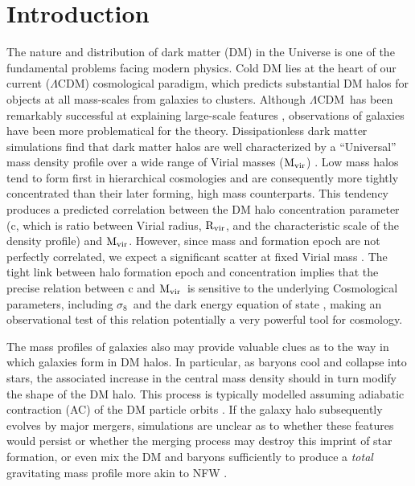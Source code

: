 \documentclass{emulateapj}
\def \eg {e.g.}
\newcommand{\mvir}{${\rm M_{vir}}$}
\newcommand{\sigmaeight}{$\sigma_8$}
\newcommand{\lcdm}{$\Lambda$CDM}
\newcommand{\rvir }{${\rm R_{vir}}$}
\begin{document}

\section{Introduction}
The nature and distribution of dark matter (DM) in the Universe is one
of the fundamental problems facing modern physics. Cold DM lies at the
heart of  our  current (\lcdm) cosmological   paradigm, which predicts
substantial  DM halos for objects  at all mass-scales from galaxies to
clusters.   Although  \lcdm\  has  been    remarkably  successful   at
explaining large-scale features
\citep[\eg][]{spergel03a,perlmutter99a}, 
observations of galaxies have been more problematical for the theory.
Dissipationless dark matter simulations find that dark matter
halos are well characterized by a
``Universal'' mass density profile \citep[][hereafter NFW]{navarro97}
over a wide range of Virial masses (\mvir) \citep[e.g.][]{bullock01a}.
Low mass halos tend to form first in hierarchical cosmologies
and are consequently more tightly concentrated than their
later forming,  high mass counterparts.
This tendency  produces a predicted correlation
between the DM halo concentration parameter (c, which is ratio between 
Virial radius, \rvir, and the characteristic scale of the density profile)
and \mvir \citep{navarro97}.  However, since mass and formation
epoch are not perfectly correlated, we expect a significant
scatter at fixed Virial mass \citep{jing00a,bullock01a,wechsler02a}.
The tight link between halo formation epoch and concentration
implies that the precise relation between c and \mvir\
is sensitive to the underlying Cosmological parameters,
including \sigmaeight\ and the dark energy equation of state
\citep{kuhlen05a}, making an observational test of this relation
potentially a very powerful tool for cosmology. 


The mass profiles of galaxies also may provide valuable clues
as to the way in which galaxies form  in DM halos. 
In particular, as baryons cool and collapse into stars, the 
associated increase in the central mass density should in turn
modify the shape of the DM halo. This process is typically 
modelled assuming adiabatic contraction (AC) of the DM particle orbits
\citep[\eg][]{blumenthal86a,gnedin04a}. 
If the galaxy halo subsequently evolves by major mergers,
simulations are unclear as to whether these features would persist 
\citep[\eg][]{gnedin04a} or whether the merging process may
destroy this imprint of star formation, or even 
mix the DM and baryons sufficiently to produce a {\em total}
gravitating mass profile more akin to NFW \citep{loeb03a,elzant04a}.
\end{document}
